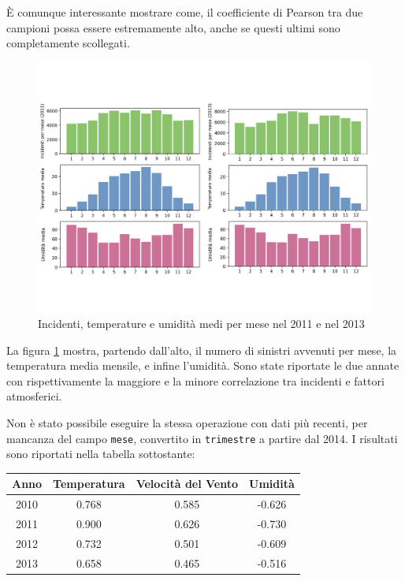 \documentclass[a4paper,12pt]{report}
\newcommand{\columnstyle}[1]{\texttt{#1}}
\begin{document}
\`E comunque interessante mostrare come, il coefficiente di Pearson tra due campioni 
possa essere estremamente alto, anche se questi ultimi sono completamente scollegati. 

\begin{figure}
    \includegraphics[width=\linewidth]{img_unite/temp_incidenti.png}
    \caption{Incidenti, temperature e umidità medi per mese nel 2011 e nel 2013}
    \label{fig:incidenti-temp}
\end{figure}

La figura \ref{fig:incidenti-temp} mostra, partendo dall'alto, il numero di sinistri 
avvenuti per mese, la temperatura media mensile, e infine l'umidità. 
Sono state riportate le due annate con rispettivamente la maggiore e la minore correlazione tra 
incidenti e fattori atmosferici. 

Non è stato possibile eseguire la stessa operazione con dati più recenti, per mancanza del 
campo \columnstyle{mese}, convertito in \columnstyle{trimestre} a partire dal 2014. 
I risultati sono riportati nella tabella sottostante: 

\begin{center}
    \def\arraystretch{1.5}%
    \begin{tabular}{ |c|c|c|c| } 
    \hline
    Anno & Temperatura & Velocità del Vento & Umidità \\ 
    \hline
    \rowcolor{TableGray}
    2010 & 0.768 & 0.585 & -0.626 \\
    2011 & 0.900 & 0.626 & -0.730 \\
    \rowcolor{TableGray}
    2012 & 0.732 & 0.501 & -0.609 \\
    2013 & 0.658 & 0.465 & -0.516 \\
    \hline
    \end{tabular}
\end{center}
\end{document}
